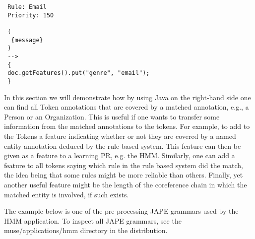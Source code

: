 \begin{small}
\begin{verbatim}
 Rule: Email  
 Priority: 150  
  
 (  
  {message}  
 )  
 -->  
 {  
 doc.getFeatures().put("genre", "email");  
 } 
\end{verbatim}
\end{small}



In this section we will demonstrate how by using Java on the
right-hand side one can find all Token annotations that are
covered by a matched annotation, e.g., a Person or an
Organization. This is useful if one wants to transfer some
information from the matched annotations to the tokens. For
example, to add to the Tokens a feature indicating whether or not
they are covered by a named entity annotation deduced by the
rule-based system. This feature can then be given as a feature to
a learning PR, e.g. the HMM. Similarly, one can add a feature to
all tokens saying which rule in the rule based system did the
match, the idea being that some rules might be more reliable than
others. Finally, yet another useful feature might be the length of
the coreference chain in which the matched entity is involved, if
such exists. 

The example below is one of the pre-processing JAPE grammars used
by the HMM application. To inspect all JAPE grammars, see the
muse/applications/hmm directory in the distribution.

